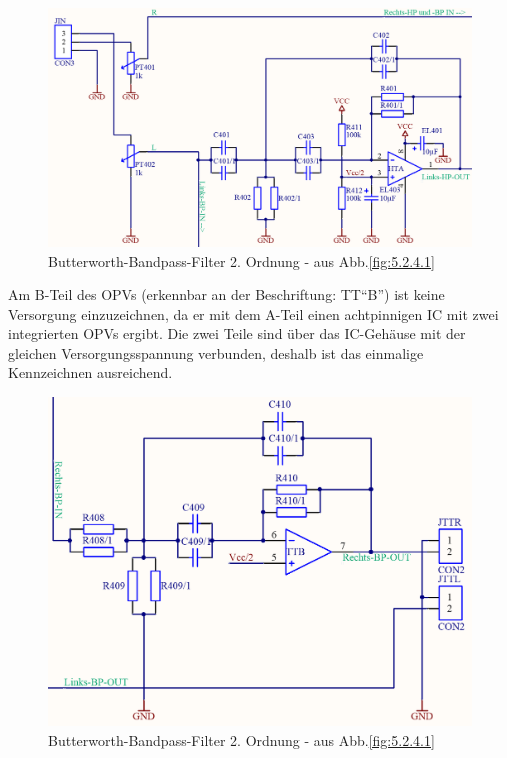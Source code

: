 \begin{figure} [H]
	\centering	
	\includegraphics[width=1\textwidth]{img/Print4/4_TTuHTWeiche-LinksHP-Schematic.PNG}
	\caption{Butterworth-Bandpass-Filter 2. Ordnung - aus Abb.\ref{fig:5.2.4.1}}
	\label {fig:5.2.4.2}
\end{figure}
Am B-Teil des OPVs (erkennbar an der Beschriftung: TT\enquote{B}) ist keine Versorgung einzuzeichnen, da er mit dem A-Teil einen achtpinnigen IC mit zwei integrierten OPVs ergibt. Die zwei Teile sind über das IC-Gehäuse mit der gleichen Versorgungsspannung verbunden, deshalb ist das einmalige Kennzeichnen ausreichend.\\
\begin{figure} [H]
	\centering	
	\includegraphics[width=1\textwidth]{img/Print4/4_TTuHTWeiche-RechtsBP-Schematic.PNG}
	\caption{Butterworth-Bandpass-Filter 2. Ordnung - aus Abb.\ref{fig:5.2.4.1}}
	\label {fig:5.2.4.3}
\end{figure}


